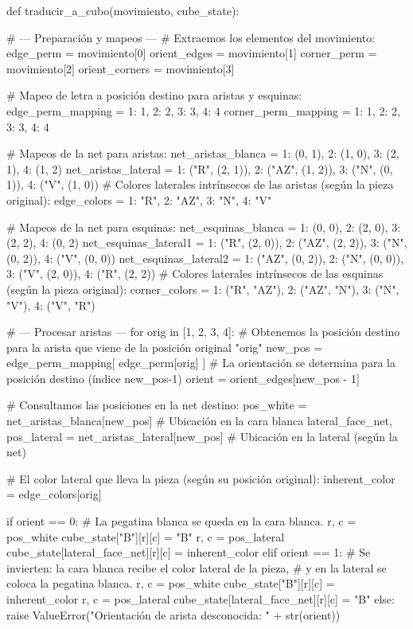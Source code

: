 def traducir_a_cubo(movimiento, cube_state):

    # --- Preparación y mapeos ---
    # Extraemos los elementos del movimiento:
    edge_perm = movimiento[0]       
    orient_edges = movimiento[1]    
    corner_perm = movimiento[2]     
    orient_corners = movimiento[3]
    
    # Mapeo de letra a posición destino para aristas y esquinas:
    edge_perm_mapping = {1: 1, 2: 2, 3: 3, 4: 4}
    corner_perm_mapping = {1: 1, 2: 2, 3: 3, 4: 4}
    
    # Mapeos de la net para aristas:
    net_aristas_blanca = {1: (0, 1), 2: (1, 0), 3: (2, 1), 4: (1, 2)}
    net_aristas_lateral = {
        1: ("R", (2, 1)),
        2: ("AZ", (1, 2)),
        3: ("N", (0, 1)),
        4: ("V", (1, 0))
    }
    # Colores laterales intrínsecos de las aristas (según la pieza original):
    edge_colors = {1: "R", 2: "AZ", 3: "N", 4: "V"}
    
    # Mapeos de la net para esquinas:
    net_esquinas_blanca = {1: (0, 0), 2: (2, 0), 3: (2, 2), 4: (0, 2)}
    net_esquinas_lateral1 = {
        1: ("R", (2, 0)),
        2: ("AZ", (2, 2)),
        3: ("N", (0, 2)),
        4: ("V", (0, 0))
    }
    net_esquinas_lateral2 = {
        1: ("AZ", (0, 2)),
        2: ("N", (0, 0)),
        3: ("V", (2, 0)),
        4: ("R", (2, 2))
    }
    # Colores laterales intrínsecos de las esquinas (según la pieza original):
    corner_colors = {
        1: ("R", "AZ"),
        2: ("AZ", "N"),
        3: ("N", "V"),
        4: ("V", "R")
    }
    
    # --- Procesar aristas ---
    for orig in [1, 2, 3, 4]:
        # Obtenemos la posición destino para la arista que viene de la posición original "orig"
        new_pos = edge_perm_mapping[ edge_perm[orig] ]
        # La orientación se determina para la posición destino (índice new_pos-1)
        orient = orient_edges[new_pos - 1]
        
        # Consultamos las posiciones en la net destino:
        pos_white = net_aristas_blanca[new_pos]     # Ubicación en la cara blanca
        lateral_face_net, pos_lateral = net_aristas_lateral[new_pos]  # Ubicación en la lateral (según la net)
        
        # El color lateral que lleva la pieza (según su posición original):
        inherent_color = edge_colors[orig]
        
        if orient == 0:
            # La pegatina blanca se queda en la cara blanca.
            r, c = pos_white
            cube_state["B"][r][c] = "B"
            r, c = pos_lateral
            cube_state[lateral_face_net][r][c] = inherent_color
        elif orient == 1:
            # Se invierten: la cara blanca recibe el color lateral de la pieza,
            # y en la lateral se coloca la pegatina blanca.
            r, c = pos_white
            cube_state["B"][r][c] = inherent_color
            r, c = pos_lateral
            cube_state[lateral_face_net][r][c] = "B"
        else:
            raise ValueError("Orientación de arista desconocida: " + str(orient))
    
